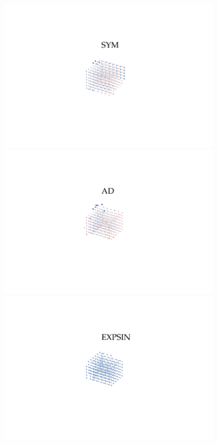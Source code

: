 \begin{figure}[h!]
    \includegraphics[trim={2.5cm 2.5cm 2.5cm 2.5cm},clip, width = 1\textwidth]{./svg-inkscape/P_3D_indSYM_svg-tex.pdf}
    \includegraphics[trim={2.5cm 2.5cm 2.5cm 2.5cm},clip, width = 1\textwidth]{./svg-inkscape/P_3D_indAD_svg-tex.pdf}
    \includegraphics[trim={2.5cm 2.5cm 2.5cm 2.5cm},clip, width = 1\textwidth]{./svg-inkscape/P_3D_indEXPSIN_svg-tex.pdf}

\end{figure}
